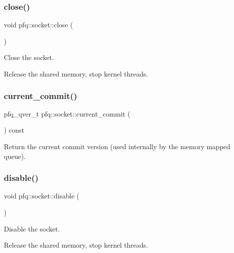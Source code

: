 \subsubsection{\texorpdfstring{close()}{close()}}
{\footnotesize\ttfamily void pfq\+::socket\+::close (\begin{DoxyParamCaption}{ }\end{DoxyParamCaption})\hspace{0.3cm}{\ttfamily [inline]}}



Close the socket. 

Release the shared memory, stop kernel threads. \mbox{\label{classpfq_1_1socket_ada49e068e1b04c22838a3fae5d629590}} 
\subsubsection{\texorpdfstring{current\+\_\+commit()}{current\_commit()}}
{\footnotesize\ttfamily pfq\+\_\+qver\+\_\+t pfq\+::socket\+::current\+\_\+commit (\begin{DoxyParamCaption}{ }\end{DoxyParamCaption}) const\hspace{0.3cm}{\ttfamily [inline]}}



Return the current commit version (used internally by the memory mapped queue). 

\mbox{\label{classpfq_1_1socket_ac7e918bff7d1672125a8549dae750dcc}} 
\subsubsection{\texorpdfstring{disable()}{disable()}}
{\footnotesize\ttfamily void pfq\+::socket\+::disable (\begin{DoxyParamCaption}{ }\end{DoxyParamCaption})\hspace{0.3cm}{\ttfamily [inline]}}



Disable the socket. 

Release the shared memory, stop kernel threads. \mbox{\label{classpfq_1_1socket_ae6cd08be2e7c35a548a64fded4359612}} 
